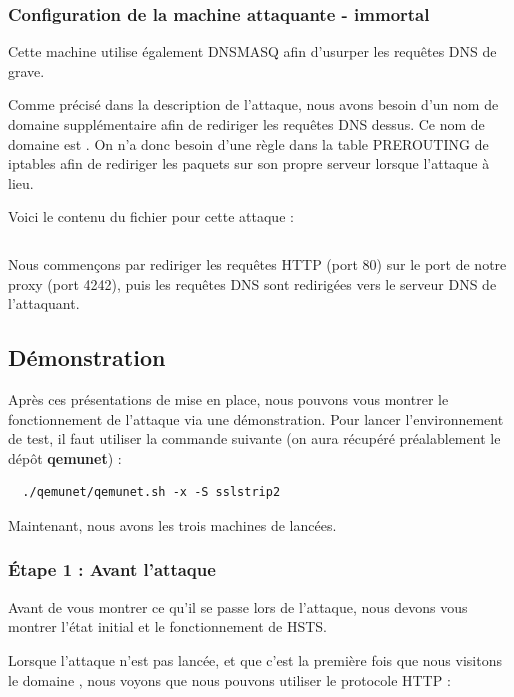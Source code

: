 \inputminted[bgcolor=lbcolor, breaklines]{shell}{../sslstrip2/opeth/start.sh}

\subsubsection{Configuration de la machine attaquante - immortal}


Cette machine utilise également DNSMASQ afin d'usurper les requêtes DNS de grave.

Comme précisé dans la description de l'attaque, nous avons besoin d'un nom de domaine supplémentaire afin de rediriger les requêtes DNS dessus. Ce nom de domaine est . On n'a donc besoin d'une règle dans la table PREROUTING de iptables afin de rediriger les paquets sur son propre serveur lorsque l'attaque à lieu.

Voici le contenu du fichier  pour cette attaque :

\inputminted[bgcolor=lbcolor, breaklines]{shell}{../sslstrip2/immortal/attack.sh}

Nous commençons par rediriger les requêtes HTTP (port 80) sur le port de notre proxy (port 4242), puis les requêtes DNS sont redirigées vers le serveur DNS de l'attaquant.

\subsection{Démonstration}

Après ces présentations de mise en place, nous pouvons vous montrer le fonctionnement de l'attaque via une démonstration. Pour lancer l'environnement de test, il faut utiliser la commande suivante (on aura récupéré préalablement le dépôt \textbf{qemunet}) :

\begin{verbatim}
  ./qemunet/qemunet.sh -x -S sslstrip2
\end{verbatim}

Maintenant, nous avons les trois machines de lancées.

\subsubsection{Étape 1 : Avant l'attaque}

Avant de vous montrer ce qu'il se passe lors de l'attaque, nous devons vous montrer l'état initial et le fonctionnement de HSTS.

Lorsque l'attaque n'est pas lancée, et que c'est la première fois que nous visitons le domaine , nous voyons que nous pouvons utiliser le protocole HTTP :

